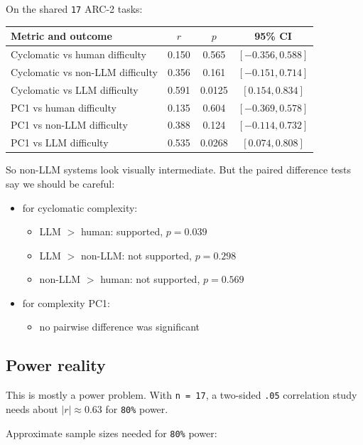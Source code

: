 \documentclass[11pt]{article}
\begin{document}
On the shared \texttt{17} ARC-2 tasks:

\begin{center}
\small
\begin{tabular}{p{2.4in}ccc}
\toprule
Metric and outcome & $r$ & $p$ & 95\% CI \\
\midrule
Cyclomatic vs human difficulty & 0.150 & 0.565 & $[-0.356, 0.588]$ \\
Cyclomatic vs non-LLM difficulty & 0.356 & 0.161 & $[-0.151, 0.714]$ \\
Cyclomatic vs LLM difficulty & 0.591 & 0.0125 & $[0.154, 0.834]$ \\
PC1 vs human difficulty & 0.135 & 0.604 & $[-0.369, 0.578]$ \\
PC1 vs non-LLM difficulty & 0.388 & 0.124 & $[-0.114, 0.732]$ \\
PC1 vs LLM difficulty & 0.535 & 0.0268 & $[0.074, 0.808]$ \\
\bottomrule
\end{tabular}
\end{center}

So non-LLM systems look visually intermediate. But the paired difference tests say we should be careful:

\begin{itemize}
  \item for cyclomatic complexity:
  \begin{itemize}
    \item LLM $>$ human: supported, $p = 0.039$
    \item LLM $>$ non-LLM: not supported, $p = 0.298$
    \item non-LLM $>$ human: not supported, $p = 0.569$
  \end{itemize}
  \item for complexity PC1:
  \begin{itemize}
    \item no pairwise difference was significant
  \end{itemize}
\end{itemize}

\subsection*{Power reality}

This is mostly a power problem. With \texttt{n = 17}, a two-sided \texttt{.05} correlation study needs about $|r| \approx 0.63$ for \texttt{80\%} power.

Approximate sample sizes needed for \texttt{80\%} power:
\end{document}
